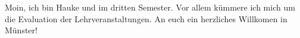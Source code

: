 \begin{multicols*}{2}
{Moin, ich bin Hauke und im dritten Semester. Vor allem kümmere ich mich um die Evaluation der Lehrveranstaltungen. An euch ein herzliches Willkomen in Münster! }


\end{multicols*}
